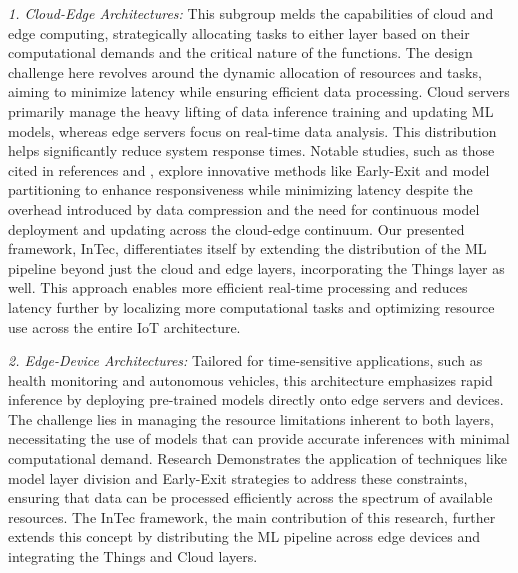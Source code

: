 	\textit{1. Cloud-Edge Architectures:} This subgroup melds the capabilities of cloud and
	edge computing, strategically allocating tasks to either layer based on their computational demands and the critical nature of the functions. The design challenge
	here revolves around the dynamic allocation of resources and tasks, aiming to
	minimize latency while ensuring efficient data processing. Cloud servers primarily manage the heavy lifting of data inference training and updating ML
	models, whereas edge servers focus on real-time data analysis. This distribution
	helps significantly reduce system response times. Notable studies, such as those
	cited in references \cite{c25} and \cite{c32}, explore innovative methods like Early-Exit and
	model partitioning to enhance responsiveness while minimizing latency despite
	the overhead introduced by data compression and the need for continuous model
	deployment and updating across the cloud-edge continuum. Our presented framework, InTec, differentiates itself by extending the distribution of the ML pipeline
	beyond just the cloud and edge layers, incorporating the Things layer as well. This
	approach enables more efficient real-time processing and reduces latency further
	by localizing more computational tasks and optimizing resource use across the
	entire IoT architecture.
	
		\textit{2. Edge-Device Architectures:} Tailored for time-sensitive applications, such as health monitoring and autonomous vehicles, this architecture emphasizes rapid inference by deploying pre-trained models directly onto edge servers and devices. The challenge lies in managing the resource limitations inherent to both layers, necessitating the use of models that can provide accurate inferences with minimal computational demand. Research \cite{c31} Demonstrates the application of techniques like model layer division and Early-Exit strategies to address these constraints, ensuring
		that data can be processed efficiently across the spectrum of available resources.
		The InTec framework, the main contribution of this research, further extends this
		concept by distributing the ML pipeline across edge devices and integrating the
		Things and Cloud layers.
	
